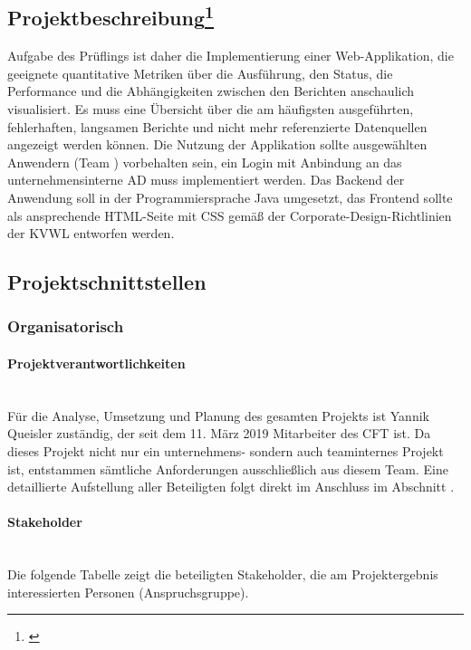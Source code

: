 \subsection[Projektbeschreibung]{Projektbeschreibung\footnote{\cite{Projektantrag}}}\label{sec:Projektbeschreibung}
\begin{displayquote}
	Aufgabe des Prüflings \autorName\xspace ist daher die Implementierung einer Web-Applikation, die geeignete quantitative Metriken über die Ausführung, den Status, die Performance und die Abhängigkeiten zwischen den Berichten anschaulich visualisiert. Es muss eine Übersicht über die am häufigsten ausgeführten, fehlerhaften, langsamen Berichte und nicht mehr referenzierte Datenquellen angezeigt werden können. Die Nutzung der Applikation sollte ausgewählten Anwendern (Team \teamName) vorbehalten sein, \dahe ein Login mit Anbindung an das unternehmensinterne \ac{AD} muss implementiert werden. Das Backend der Anwendung soll in der Programmiersprache Java umgesetzt, das Frontend sollte als ansprechende HTML-Seite mit CSS gemäß der Corporate-Design-Richtlinien der \ac{KVWL} entworfen werden.
\end{displayquote}

\subsection{Projektschnittstellen}\label{sec:Projektschnittstellen}

\subsubsection{Organisatorisch}\label{sec:Projektschnittstellen:Organisatorisch}

\paragraph{Projektverantwortlichkeiten}~\\\label{p:Projektverantwortlichkeiten}
Für die Analyse, Umsetzung und Planung des gesamten Projekts ist Yannik Queisler zuständig, der seit dem 11. März 2019 Mitarbeiter des \ac{CFT} \teamName ist. Da dieses Projekt nicht nur ein unternehmens- sondern auch teaminternes Projekt ist, entstammen sämtliche Anforderungen ausschließlich aus diesem Team. Eine detaillierte Aufstellung aller Beteiligten folgt direkt im Anschluss im Abschnitt .

\paragraph{Stakeholder}~\\\label{p:Stakeholder}
Die folgende Tabelle zeigt die beteiligten Stakeholder, \dahe die am Projektergebnis interessierten Personen (Anspruchsgruppe).

